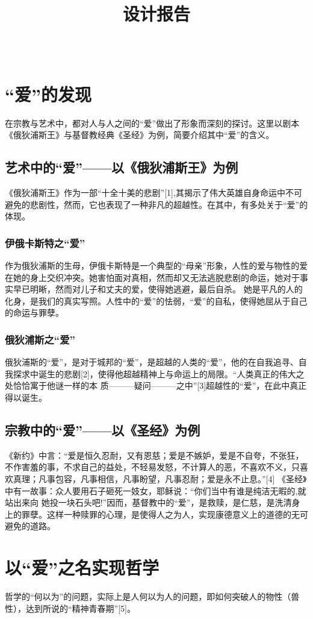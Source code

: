 \documentclass[lang=cn,11pt]{elegantpaper}
\title{设计报告}
\author{\rightline{南开大学1队}  \\ \rightline{朱彦谕、王继铭、刘炼}}
\date{}
\begin{document}
\maketitle

\section{“爱”的发现}
在宗教与艺术中，都对人与人之间的“爱”做出了形象而深刻的探讨。这里以剧本《俄狄浦斯王》与基督教经典《圣经》为例，简要介绍其中“爱”的含义。
\subsection{艺术中的“爱”——以《俄狄浦斯王》为例}
《俄狄浦斯王》作为一部“十全十美的悲剧”[1],其揭示了伟大英雄自身命运中不可避免的悲剧性，然而，它也表现了一种非凡的超越性。在其中，有多处关于“爱”的体现。
\subsubsection{伊俄卡斯特之“爱”}
作为俄狄浦斯的生母，伊俄卡斯特是一个典型的“母亲”形象，人性的爱与物性的爱在她的身上交织冲突。她害怕面对真相，然而却又无法逃脱悲剧的命运，她对于事实早已明晰，然而对儿子和丈夫的爱，使得她逃避，最后自杀。
她是平凡的人的化身，是我们的真实写照。人性中的“爱”的怯弱，“爱”的自私，使得她屈从于自己的命运与罪孽。
\subsubsection{俄狄浦斯之“爱”}
俄狄浦斯的“爱”，是对于城邦的“爱”，是超越的人类的“爱”，他的在自我追寻、自我探求中诞生的悲剧[2]，使得他超越精神上与命运上的局限。“人类真正的伟大之处恰恰寓于他谜一样的本
质———疑问———之中”[3]超越性的“爱”，在此中真正得以诞生。
\subsection{宗教中的“爱”——以《圣经》为例}
《新约》中言：“爱是恒久忍耐，又有恩慈；爱是不嫉妒，爱是不自夸，不张狂，不作害羞的事，不求自己的益处，不轻易发怒，不计算人的恶，不喜欢不义，只喜欢真理；凡事包容，凡事相信，凡事盼望，凡事忍耐；爱是永不止息。”[4]
《圣经》中有一故事：众人要用石子砸死一妓女，耶稣说：“你们当中有谁是纯洁无暇的,就站出来向 她投一块石头吧!”因而，基督教中的“爱”，是救赎，是仁慈，是洗清身上的罪孽。这样一种赎罪的心理，是使得人之为人，实现康德意义上的道德的无可避免的道路。

\section{以“爱”之名实现哲学}
哲学的“何以为”的问题，实际上是人何以为人的问题，即如何突破人的物性（兽性），达到所说的“精神青春期”[5]。
\end{document}
